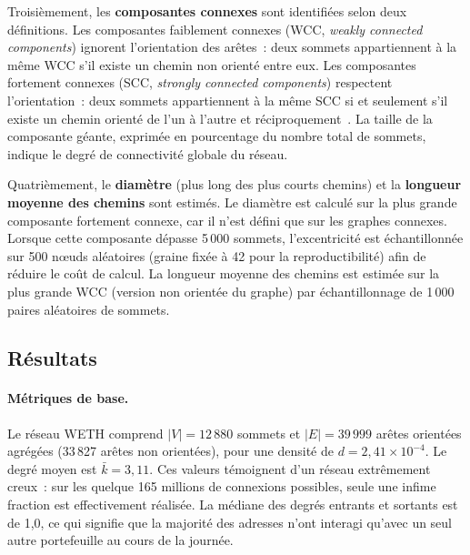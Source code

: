 Troisi\`emement, les \textbf{composantes connexes} sont identifi\'ees selon deux d\'efinitions. Les composantes faiblement connexes (WCC, \textit{weakly connected components}) ignorent l'orientation des ar\^etes~: deux sommets appartiennent \`a la m\^eme WCC s'il existe un chemin non orient\'e entre eux. Les composantes fortement connexes (SCC, \textit{strongly connected components}) respectent l'orientation~: deux sommets appartiennent \`a la m\^eme SCC si et seulement s'il existe un chemin orient\'e de l'un \`a l'autre et r\'eciproquement~\cite{newman2018networks}. La taille de la composante g\'eante, exprim\'ee en pourcentage du nombre total de sommets, indique le degr\'e de connectivit\'e globale du r\'eseau.

Quatri\`emement, le \textbf{diam\`etre} (plus long des plus courts chemins) et la \textbf{longueur moyenne des chemins} sont estim\'es. Le diam\`etre est calcul\'e sur la plus grande composante fortement connexe, car il n'est d\'efini que sur les graphes connexes. Lorsque cette composante d\'epasse 5\,000 sommets, l'excentricit\'e est \'echantillonn\'ee sur 500 n\oe{}uds al\'eatoires (graine fix\'ee \`a 42 pour la reproductibilit\'e) afin de r\'eduire le co\^ut de calcul. La longueur moyenne des chemins est estim\'ee sur la plus grande WCC (version non orient\'ee du graphe) par \'echantillonnage de 1\,000 paires al\'eatoires de sommets.

\subsection{R\'esultats}
\label{sec:rq1_resultats}

\paragraph{M\'etriques de base.}
Le r\'eseau WETH comprend $|V| = 12\,880$ sommets et $|E| = 39\,999$ ar\^etes orient\'ees agr\'eg\'ees (33\,827 ar\^etes non orient\'ees), pour une densit\'e de $d = 2{,}41 \times 10^{-4}$. Le degr\'e moyen est $\bar{k} = 3{,}11$. Ces valeurs t\'emoignent d'un r\'eseau extr\^emement creux~: sur les quelque 165 millions de connexions possibles, seule une infime fraction est effectivement r\'ealis\'ee. La m\'ediane des degr\'es entrants et sortants est de 1{,}0, ce qui signifie que la majorit\'e des adresses n'ont interagi qu'avec un seul autre portefeuille au cours de la journ\'ee.

